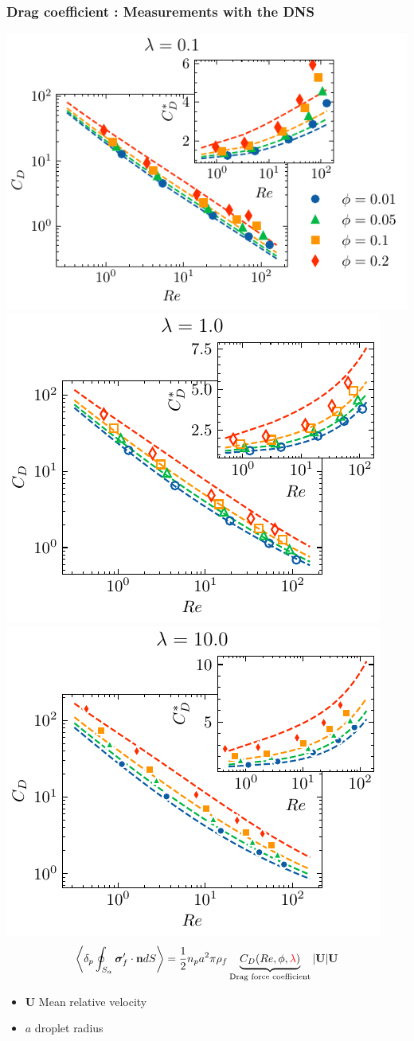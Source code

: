 \documentclass{sintefbeamer}
\begin{document}
\begin{frame}
  \frametitle{Drag   coefficient : Measurements with the DNS}

\centering    
\includegraphics[height = 0.25\textwidth]{image/HOMOGENEOUS_final/CA/Cp_l_0.pdf}
\includegraphics[height = 0.25\textwidth]{image/HOMOGENEOUS_final/CA/Cp_l_1.pdf}
\includegraphics[height = 0.25\textwidth]{image/HOMOGENEOUS_final/CA/Cp_l_10.pdf}
\begin{equation*}
\left<\delta_p \oint_{S_{\alpha}} {\bm{\sigma}_f' \cdot \textbf{n}} dS\right>
= 
 \frac{1}{2} n_p a^2 \pi \rho_f 
  \underbrace{C_D(Re,\phi,\textcolor{red}{\lambda})  }_\text{Drag force coefficient}
  |\textbf{U}| \textbf{U}
\end{equation*}
\begin{itemize}
    \item $\textbf{U}$ Mean relative velocity 
    \item $a$ droplet radius
\end{itemize}
\end{frame}
\end{document}
